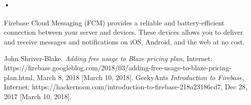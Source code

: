 \documentclass[7pt]{article}
\begin{document}
\paragraph{•}
Firebase Cloud Messaging (FCM) provides a reliable and battery-efficient connection between your server and devices. These devices allows you to deliver and receive messages and notifications on iOS, Android, and the web at no cost.\cite{dora}\\

\newpage

\begin{thebibliography}{9}
 John Shriver-Blake. \textit{Adding free usage to Blaze pricing plan}, 
Internet: https://firebase.googleblog.com/2018/03/adding-free-usage-to-blaze-pricing-plan.html, March 8, 2018 [March 10, 2018].
GeekyAnts \textit{Introduction to Firebase}, 
Internet: https://hackernoon.com/introduction-to-firebase-218a23186cd7, Dec 28, 2017 [March 10, 2018].
\end{thebibliography}
\end{document}
